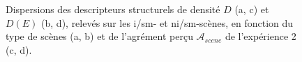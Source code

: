 \begin{figure}[t]
        \myfloatalign
        \par
       \caption{Dispersions des descripteurs structurels de densité $D$ (a, c) et $D(E)$ (b, d), relevés sur les i/sm- et ni/sm-scènes, en fonction du type de scènes (a, b) et de l'agrément perçu $\mathcal{A}_{scene}$ de l'expérience 2 (c, d).}\label{fig:densitySansMarker}
\end{figure}

